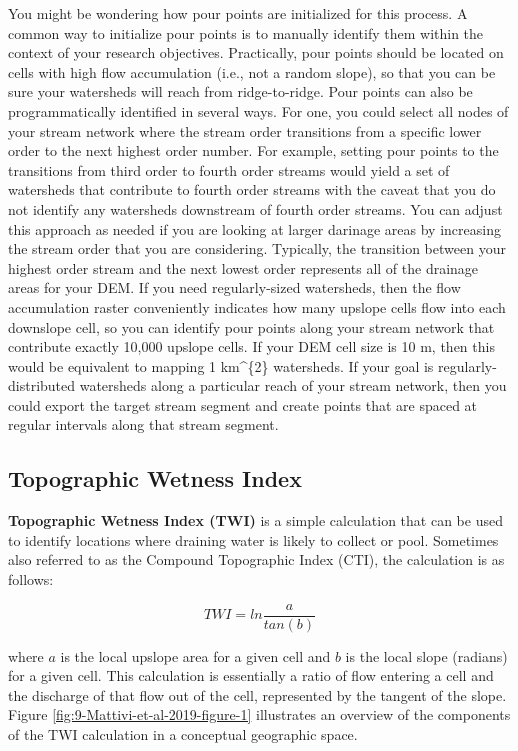 \documentclass[
]{book}
\begin{document}
You might be wondering how pour points are initialized for this process. A common way to initialize pour points is to manually identify them within the context of your research objectives. Practically, pour points should be located on cells with high flow accumulation (i.e., not a random slope), so that you can be sure your watersheds will reach from ridge-to-ridge. Pour points can also be programmatically identified in several ways. For one, you could select all nodes of your stream network where the stream order transitions from a specific lower order to the next highest order number. For example, setting pour points to the transitions from third order to fourth order streams would yield a set of watersheds that contribute to fourth order streams with the caveat that you do not identify any watersheds downstream of fourth order streams. You can adjust this approach as needed if you are looking at larger darinage areas by increasing the stream order that you are considering. Typically, the transition between your highest order stream and the next lowest order represents all of the drainage areas for your DEM. If you need regularly-sized watersheds, then the flow accumulation raster conveniently indicates how many upslope cells flow into each downslope cell, so you can identify pour points along your stream network that contribute exactly 10,000 upslope cells. If your DEM cell size is 10 m, then this would be equivalent to mapping 1 km\^{}\{2\} watersheds. If your goal is regularly-distributed watersheds along a particular reach of your stream network, then you could export the target stream segment and create points that are spaced at regular intervals along that stream segment.

\subsection{Topographic Wetness Index}\label{topographic-wetness-index}

\textbf{Topographic Wetness Index (TWI)} is a simple calculation that can be used to identify locations where draining water is likely to collect or pool. Sometimes also referred to as the Compound Topographic Index (CTI), the calculation is as follows:

\[
TWI=ln\frac{a}{tan(b)}
\]

where \(a\) is the local upslope area for a given cell and \(b\) is the local slope (radians) for a given cell. This calculation is essentially a ratio of flow entering a cell and the discharge of that flow out of the cell, represented by the tangent of the slope. Figure \ref{fig:9-Mattivi-et-al-2019-figure-1} illustrates an overview of the components of the TWI calculation in a conceptual geographic space.
\end{document}

